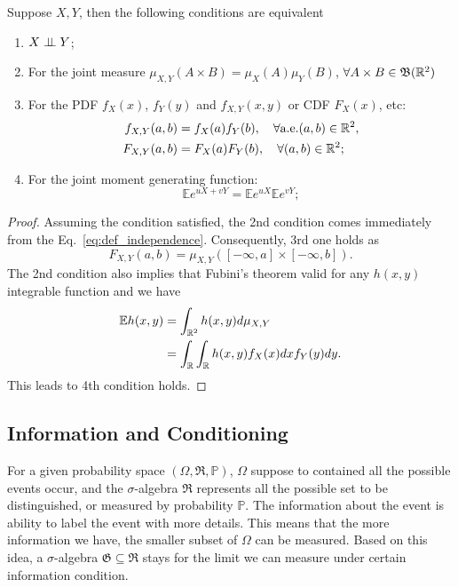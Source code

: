 \begin{theorem}
Suppose $X,Y$, then the following conditions are equivalent
\begin{enumerate}
	\item  $X\perp\!\!\!\perp Y$;
	\item For the joint measure $\mu_{X,Y}(A\times B)=\mu_X(A)\mu_Y(B)$, $\forall A\times B\in\mathfrak{B}(\mathbb{R}^2)$
	\item For the PDF $f_X(x)$, $f_Y(y)$ and $f_{X,Y}(x,y)$ or CDF $F_X(x)$, etc:
	\begin{equation}
	\begin{aligned}
	f_{X,Y}(a,b) &= f_X(a)f_Y(b),\quad \forall\text{a.e.} (a,b)\in\mathbb{R}^2,\\
	F_{X,Y}(a,b) &= F_X(a)F_Y(b),\quad \forall (a,b)\in\mathbb{R}^2;
	\end{aligned}
	\end{equation}
	\item For the joint moment generating function:
	\begin{equation}
	\mathbb{E}e^{uX+vY}=\mathbb{E}e^{uX}\mathbb{E}e^{vY};
	\end{equation}
\end{enumerate}
\end{theorem}
\begin{proof}
Assuming the condition satisfied, the 2nd condition comes immediately from the Eq.~\ref{eq:def_independence}. Consequently, 3rd one holds as 
\begin{equation}
F_{X,Y}(a,b) = \mu_{X,Y}([-\infty,a]\times[-\infty,b]).
\end{equation}
The 2nd condition also implies that Fubini's theorem valid for any $h(x,y)$ integrable function and we have
\begin{equation}
\begin{aligned}
\mathbb{E}h(x,y)&=\int_{\mathbb{R}^2}h(x,y)d\mu_{X,Y}\\
&=\int_{\mathbb{R}} \int_{\mathbb{R}} h(x,y)f_X(x)dx f_Y(y)dy.
\end{aligned}
\end{equation}
This leads to 4th condition holds.
\end{proof}


\subsection{Information and Conditioning}
For a given probability space $(\Omega, \mathfrak{R},\mathbb{P})$, $\Omega$ suppose to contained all the possible events occur, and the $\sigma$-algebra $\mathfrak{R}$ represents all the possible set to be distinguished, or measured by probability $\mathbb{P}$. The information about the event is ability to label the event with more details. This means that the more information we have, the smaller subset of $\Omega$ can be measured. Based on this idea, a $\sigma$-algebra $\mathfrak{G}\subseteq \mathfrak{R}$ stays for the limit we can measure under certain information condition.

